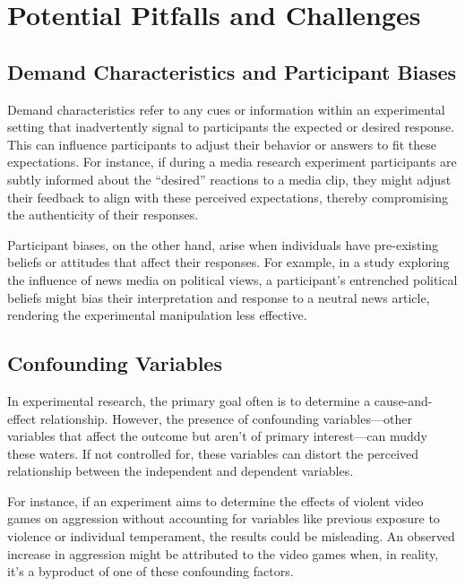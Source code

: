 \documentclass[
  b5paper]{book}
\begin{document}
\hypertarget{potential-pitfalls-and-challenges-1}{%
\section{Potential Pitfalls and Challenges}\label{potential-pitfalls-and-challenges-1}}

\hypertarget{demand-characteristics-and-participant-biases}{%
\subsection*{Demand Characteristics and Participant Biases}\label{demand-characteristics-and-participant-biases}}

Demand characteristics refer to any cues or information within an experimental setting that inadvertently signal to participants the expected or desired response. This can influence participants to adjust their behavior or answers to fit these expectations. For instance, if during a media research experiment participants are subtly informed about the ``desired'' reactions to a media clip, they might adjust their feedback to align with these perceived expectations, thereby compromising the authenticity of their responses.

Participant biases, on the other hand, arise when individuals have pre-existing beliefs or attitudes that affect their responses. For example, in a study exploring the influence of news media on political views, a participant's entrenched political beliefs might bias their interpretation and response to a neutral news article, rendering the experimental manipulation less effective.

\hypertarget{confounding-variables}{%
\subsection*{Confounding Variables}\label{confounding-variables}}

In experimental research, the primary goal often is to determine a cause-and-effect relationship. However, the presence of confounding variables---other variables that affect the outcome but aren't of primary interest---can muddy these waters. If not controlled for, these variables can distort the perceived relationship between the independent and dependent variables.

For instance, if an experiment aims to determine the effects of violent video games on aggression without accounting for variables like previous exposure to violence or individual temperament, the results could be misleading. An observed increase in aggression might be attributed to the video games when, in reality, it's a byproduct of one of these confounding factors.
\end{document}
